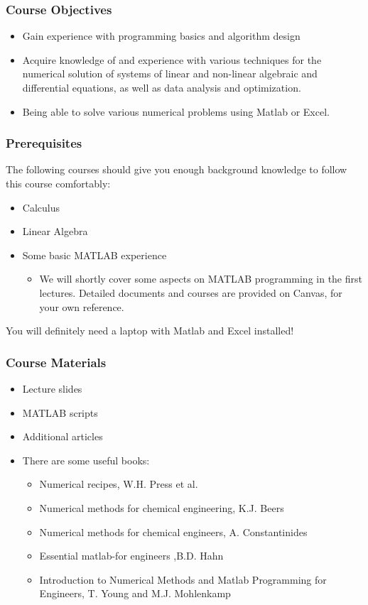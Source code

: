 \begin{frame}
 \frametitle{Course Objectives}
 \begin{itemize}
  \item Gain experience with programming basics and algorithm design
  \item Acquire knowledge of and experience with various techniques for the numerical solution of systems of linear and non-linear algebraic and differential equations, as well as data analysis and optimization.
  \item Being able to solve various numerical problems using Matlab or Excel. 
 \end{itemize}
\end{frame}

\begin{frame}
 \frametitle{Prerequisites}
  The following courses should give you enough background knowledge to follow this course comfortably:
 \begin{itemize}
   \item Calculus
   \item Linear Algebra
   \item Some basic MATLAB experience
     \begin{itemize}
       \item We will shortly cover some aspects on MATLAB programming in the first lectures. Detailed documents and courses are provided on Canvas, for your own reference.
     \end{itemize}
    \end{itemize}
    You will definitely need a laptop with Matlab and Excel installed!
\end{frame}

\begin{frame}
 \frametitle{Course Materials}
 \begin{itemize}
  \item Lecture slides
  \item MATLAB scripts
  \item Additional articles
  \item There are some useful books:
  \begin{itemize}
    \item Numerical recipes, W.H. Press et al.
    \item Numerical methods for chemical engineering, K.J. Beers
    \item Numerical methods for chemical engineers, A. Constantinides
    \item Essential matlab-for engineers ,B.D. Hahn
    \item Introduction to Numerical Methods and Matlab Programming for Engineers, T. Young and M.J. Mohlenkamp
  \end{itemize}
 \end{itemize}
\end{frame}

